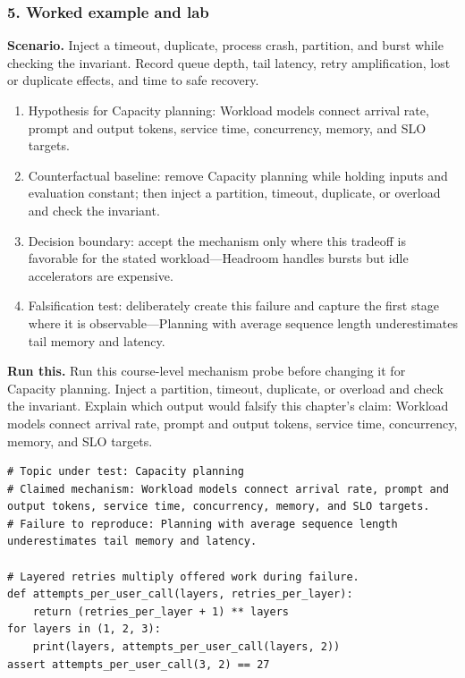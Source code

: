 \subsubsection*{5. Worked example and lab}
\textbf{Scenario.} Inject a timeout, duplicate, process crash, partition, and burst while checking the invariant. Record queue depth, tail latency, retry amplification, lost or duplicate effects, and time to safe recovery.
\begin{enumerate}
\item Hypothesis for Capacity planning: Workload models connect arrival rate, prompt and output tokens, service time, concurrency, memory, and SLO targets.
\item Counterfactual baseline: remove Capacity planning while holding inputs and evaluation constant; then inject a partition, timeout, duplicate, or overload and check the invariant.
\item Decision boundary: accept the mechanism only where this tradeoff is favorable for the stated workload—Headroom handles bursts but idle accelerators are expensive.
\item Falsification test: deliberately create this failure and capture the first stage where it is observable—Planning with average sequence length underestimates tail memory and latency.
\end{enumerate}
\textbf{Run this.} Run this course-level mechanism probe before changing it for Capacity planning. Inject a partition, timeout, duplicate, or overload and check the invariant. Explain which output would falsify this chapter's claim: Workload models connect arrival rate, prompt and output tokens, service time, concurrency, memory, and SLO targets.
\begin{Verbatim}[fontsize=\scriptsize]
# Topic under test: Capacity planning
# Claimed mechanism: Workload models connect arrival rate, prompt and output tokens, service time, concurrency, memory, and SLO targets.
# Failure to reproduce: Planning with average sequence length underestimates tail memory and latency.

# Layered retries multiply offered work during failure.
def attempts_per_user_call(layers, retries_per_layer):
    return (retries_per_layer + 1) ** layers
for layers in (1, 2, 3):
    print(layers, attempts_per_user_call(layers, 2))
assert attempts_per_user_call(3, 2) == 27
\end{Verbatim}
